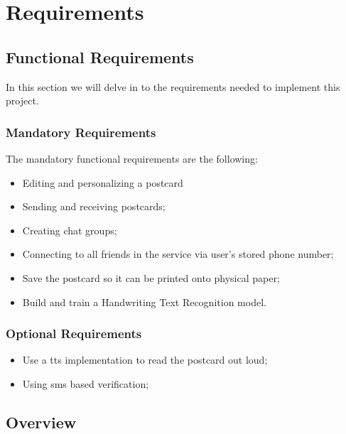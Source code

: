\chapter{Requirements}
\label{ch:Chapter3}
\vfill \minitoc \newpage

\section{Functional Requirements}
In this section we will delve in to the requirements needed to implement this project. %


\subsection{Mandatory Requirements}

The mandatory functional requirements are the following:
\begin{itemize}
    \item Editing and personalizing a postcard

	\item Sending and receiving postcards;
	
	\item Creating chat groups;
	
	\item Connecting to all friends in the service via user's stored phone number;
	
	\item Save the postcard so it can be printed onto physical paper;

    \item Build and train a Handwriting Text Recognition model.
\end{itemize}


\subsection{Optional Requirements}

\begin{itemize}
        \item Use a \gls{tts} implementation to read the postcard out loud;
        \item Using \gls{sms} based verification;
\end{itemize}

\bigskip 

\section{Overview}
\noindent

